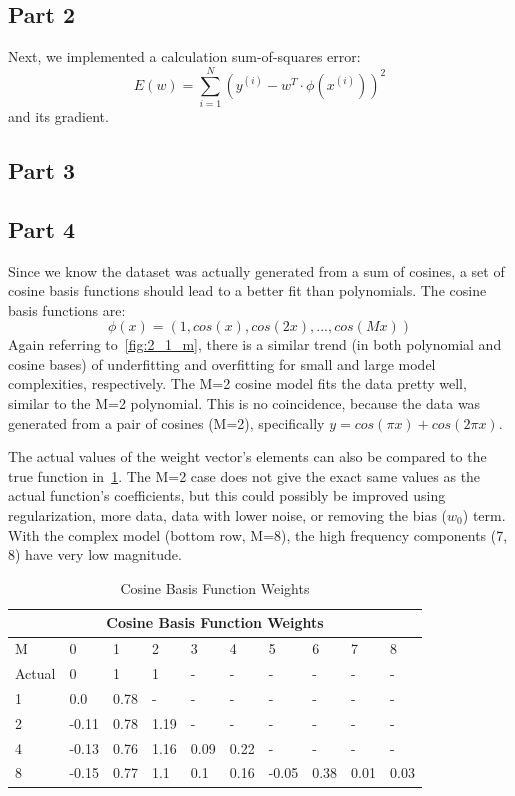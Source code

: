 \subsection{Part 2}
Next, we implemented a calculation sum-of-squares error:
\begin{equation}
E(w) = \sum_{i=1}^{N} (y^{(i)}-w^T\cdot \phi(x^{(i)}))^2
\end{equation}
and its gradient.

\subsection{Part 3}


\subsection{Part 4}
Since we know the dataset was actually generated from a sum of cosines, a set of cosine basis functions should lead to a better fit than polynomials.
The cosine basis functions are:
\begin{equation}
	\phi(x)=(1, cos(x), cos(2x), ... , cos(Mx))
\end{equation}
Again referring to~\cref{fig:2_1_m}, there is a similar trend (in both polynomial and cosine bases) of underfitting and overfitting for small and large model complexities, respectively.
The M=2 cosine model fits the data pretty well, similar to the M=2 polynomial.
This is no coincidence, because the data was generated from a pair of cosines (M=2), specifically $y = cos(\pi x) + cos(2\pi x)$.

The actual values of the weight vector's elements can also be compared to the true function in~\cref{table:w}.
The M=2 case does not give the exact same values as the actual function's coefficients, but this could possibly be improved using regularization, more data, data with lower noise, or removing the bias ($w_0$) term.
With the complex model (bottom row, M=8), the high frequency components (7, 8) have very low magnitude.

\begin{table}[t]
  \centering
  \caption[]{Cosine Basis Function Weights}
	\begin{tabular}{|p{1cm}||p{1cm}|p{1cm}|p{1cm}|p{1cm}|p{1cm}|p{1cm}|p{1cm}|p{1cm}|p{1cm}|}
	 \hline
	 \multicolumn{10}{|c|}{Cosine Basis Function Weights} \\
	 \hline
	 M & 0 & 1 & 2 & 3 & 4 & 5 & 6 & 7 & 8 \\
	 \hline\hline
	 Actual & 0 & 1 & 1 & - & - & - & - & - & - \\
	 1 & 0.0 & 0.78 & - & - & - & - & - & - & - \\
	 2 & -0.11 & 0.78 & 1.19 & - & - & - & - & - & - \\
	 4 & -0.13 & 0.76 & 1.16 & 0.09 & 0.22 & - & - & - & - \\
	 8 & -0.15 & 0.77 & 1.1 & 0.1 & 0.16 & -0.05 & 0.38 & 0.01 & 0.03  \\
	 \hline
	\end{tabular}
	\label{table:w}
\end{table}

